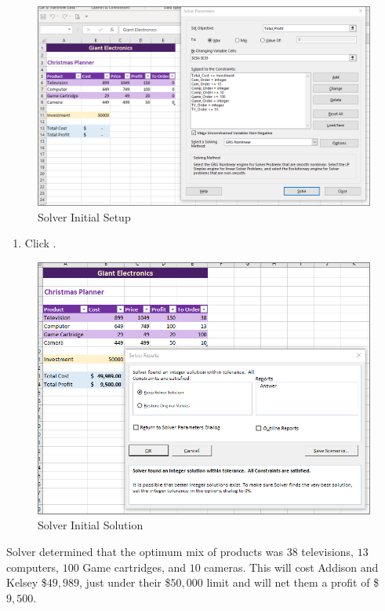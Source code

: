 \begin{figure}[H]
	\centering
	\includegraphics[width=\maxwidth{.95\linewidth}]{gfx/ch08_fig81}
	\caption{Solver Initial Setup}
	\label{08:fig81}
\end{figure}

\begin{enumerate}[resume]
	\item Click .
\end{enumerate}

\begin{figure}[H]
	\centering
	\includegraphics[width=\maxwidth{.95\linewidth}]{gfx/ch08_fig82}
	\caption{Solver Initial Solution}
	\label{08:fig82}
\end{figure}

Solver determined that the optimum mix of products was $ 38 $ televisions, $ 13 $ computers, $ 100 $ Game cartridges, and $ 10 $ cameras. This will cost Addison and Kelsey \$$ 49,989 $, just under their \$$ 50,000 $ limit and will net them a profit of \$$ 9,500 $. 

